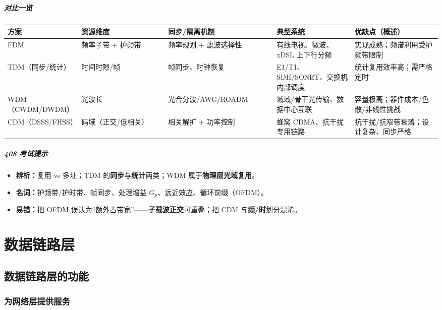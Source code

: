 \documentclass[lang=cn,newtx,10pt,scheme=chinese]{../../elegantbook}
\begin{document}
\paragraph{对比一览}
{\small\begin{longtable}{|p{0.17\linewidth}|p{0.20\linewidth}|p{0.25\linewidth}|p{0.18\linewidth}|p{0.20\linewidth}|}
\hline
	\textbf{方案} & \textbf{资源维度} & \textbf{同步/隔离机制} & \textbf{典型系统} & \textbf{优缺点（概述）} \\
\hline
FDM & 频率子带 + 护频带 & 频率规划 + 滤波选择性 & 有线电视、微波、xDSL 上下行分频 & 实现成熟；频谱利用受护频带限制 \\
\hline
TDM（同步/统计） & 时间时隙/帧 & 帧同步、时钟恢复 & E1/T1、SDH/SONET、交换机内部调度 & 统计复用效率高；需严格定时 \\
\hline
WDM（CWDM/DWDM） & 光波长 & 光合分波/AWG/ROADM & 城域/骨干光传输、数据中心互联 & 容量极高；器件成本/色散/非线性挑战 \\
\hline
CDM（DSSS/FHSS） & 码域（正交/低相关） & 相关解扩 + 功率控制 & 蜂窝 CDMA、抗干扰专用链路 & 抗干扰/抗窄带衰落；设计复杂、同步严格 \\
\hline
\end{longtable}}

\paragraph{408 考试提示}
\begin{itemize}
    \item \textbf{辨析：}复用 vs 多址；TDM 的\textbf{同步}与\textbf{统计}两类；WDM 属于\textbf{物理层光域复用}。
    \item \textbf{名词：}护频带/护时带、帧同步、处理增益 $G_p$、远近效应、循环前缀（OFDM）。
    \item \textbf{易错：}把 OFDM 误认为“额外占带宽”——\textbf{子载波正交}可重叠；把 CDM 与\textbf{频/时}划分混淆。
\end{itemize}



\chapter{数据链路层}

\section{数据链路层的功能}
\subsection{为网络层提供服务}
\end{document}
